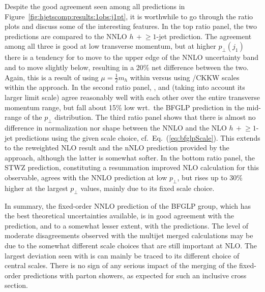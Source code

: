 Despite the good agreement seen among all predictions in
Figure~\ref{fig:hjetscomp:results:1obs:j1pt}, it is worthwhile to go
through the ratio plots and discuss some of the interesting features.
In the top ratio panel, the two \NNLOPS predictions are compared to the
NNLO $h\,+\!\ge\!\!1$-jet prediction. The agreement among all three is
good at low transverse momentum, but at higher $p_\perp(j_1)$ there is
a tendency for \Sherpa \NNLOPS to move to the upper edge of the NNLO 
uncertainty band and \Powheg \NNLOPS to move slightly below, resulting 
in a 20\% net difference between the two. Again, this is a result of using
$\mu=\tfrac{1}{2}m_h$ within \Sherpa versus using \Minlo/CKKW scales within the
\Powheg approach. In the second ratio panel, \Herwig, \Sherpa and \MGaMC
(taking into account its larger limit scale) agree reasonably well
with each other over the entire transverse momentum range, but fall
about 15\% low wrt.~the BFGLP prediction in the mid-range of the
$p_\perp$ distribution. The third ratio panel shows that there is almost no
difference in normalization nor shape between the NNLO and the NLO
$h\,+\!\ge\!\!1$-jet predictions using the given scale choice,
cf.~Eq.~(\ref{eq:bfglpScale}). This extends to the \Minlo reweighted
NLO result and the nNLO prediction provided by the \Loopsim approach, although the
latter is somewhat softer. In the bottom ratio panel, the STWZ prediction, 
constituting a resummation improved NLO calculation for this observable,  
agrees with the NNLO prediction at low $p_\perp$, but rises up to 30\%
higher at the largest $p_\perp$ values, mainly due to its fixed scale choice. 

In summary, the fixed-order NNLO prediction of the BFGLP group, which
has the best theoretical uncertainties available, is in good agreement
with the \Sherpa \NNLOPS prediction, and to a
somewhat lesser extent, with the \Powheg \NNLOPS predictions. The level of
moderate disagreements observed with the multijet merged calculations 
may be due to the somewhat different scale choices that are still important 
at NLO. The largest deviation seen with \MGaMC is can mainly be traced to 
its different choice of central scales. There is no sign of any serious 
impact of the merging of the
fixed-order predictions with parton showers, as expected for such an
inclusive cross section.

